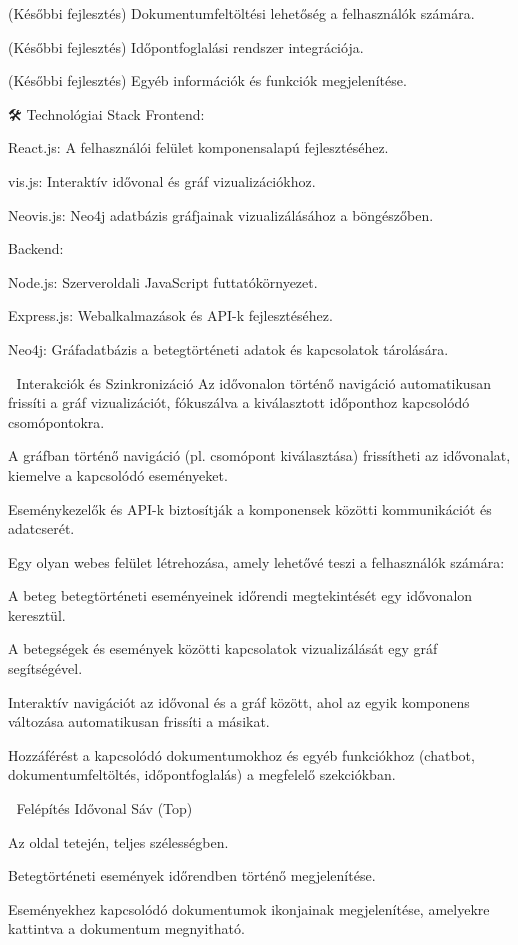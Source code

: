(Későbbi fejlesztés) Dokumentumfeltöltési lehetőség a felhasználók számára.​

(Későbbi fejlesztés) Időpontfoglalási rendszer integrációja.​

(Későbbi fejlesztés) Egyéb információk és funkciók megjelenítése.​

🛠️ Technológiai Stack
Frontend:

React.js: A felhasználói felület komponensalapú fejlesztéséhez.​

vis.js: Interaktív idővonal és gráf vizualizációkhoz.​

Neovis.js: Neo4j adatbázis gráfjainak vizualizálásához a böngészőben.​

Backend:

Node.js: Szerveroldali JavaScript futtatókörnyezet.​

Express.js: Webalkalmazások és API-k fejlesztéséhez.​

Neo4j: Gráfadatbázis a betegtörténeti adatok és kapcsolatok tárolására.​

🔄 Interakciók és Szinkronizáció
Az idővonalon történő navigáció automatikusan frissíti a gráf vizualizációt, fókuszálva a kiválasztott időponthoz kapcsolódó csomópontokra.​

A gráfban történő navigáció (pl. csomópont kiválasztása) frissítheti az idővonalat, kiemelve a kapcsolódó eseményeket.​

Eseménykezelők és API-k biztosítják a komponensek közötti kommunikációt és adatcserét.​

Egy olyan webes felület létrehozása, amely lehetővé teszi a felhasználók számára:​

A beteg betegtörténeti eseményeinek időrendi megtekintését egy idővonalon keresztül.​

A betegségek és események közötti kapcsolatok vizualizálását egy gráf segítségével.​

Interaktív navigációt az idővonal és a gráf között, ahol az egyik komponens változása automatikusan frissíti a másikat.​

Hozzáférést a kapcsolódó dokumentumokhoz és egyéb funkciókhoz (chatbot, dokumentumfeltöltés, időpontfoglalás) a megfelelő szekciókban.​

🧱 Felépítés
Idővonal Sáv (Top)

Az oldal tetején, teljes szélességben.​

Betegtörténeti események időrendben történő megjelenítése.​

Eseményekhez kapcsolódó dokumentumok ikonjainak megjelenítése, amelyekre kattintva a dokumentum megnyitható.​

